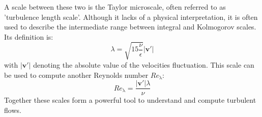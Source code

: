 \documentclass[11pt,a4paper,openany,oneside,parskip=half*]{article}
\renewcommand*\vec[1]{\boldsymbol{#1}}
\begin{document}
\newline
A scale between these two is the Taylor microscale, often referred to as 'turbulence length scale'. 
Although it lacks of a physical interpretation, it is often used to describe the intermediate range between integral and Kolmogorov scales. 
Its definition is: 
\begin{equation}
\lambda = \sqrt{15 \frac{\nu}{\epsilon}} |\vec{v'}|
\end{equation}
with $|\vec{v'}|$ denoting the absolute value of the velocities fluctuation. This scale can be used to compute another Reynolds number $Re_\mathrm{\lambda}$:
\begin{equation}
Re_\mathrm{\lambda} = \frac{|\vec{v'}| \lambda}{\nu}
\end{equation}
Together these scales form a powerful tool to understand and compute turbulent flows. 
\pagebreak
\end{document}
